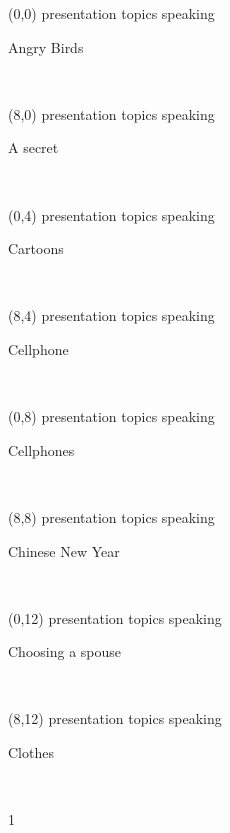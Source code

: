 \documentclass[a4paper]{article}
\newcommand{\mycard}[5]{%
	\small #1 #2
	\par
	\parbox[t][6.7cm][c]{9.5cm}{%
	\hspace{0.1cm} \Large#3\\
	\normalsize#4 #5
	}
}
\begin{document}
\selectfont

\begin{textblock}{8}(0,0)
\mycard{presentation topics}{speaking}{\parbox{9.0cm}{
\centering Angry Birds   
}}{}{} 
\end{textblock}

\begin{textblock}{8}(8,0)
\mycard{presentation topics}{speaking}{\parbox{9.0cm}{
\centering A secret    
}}{}{} 
\end{textblock}

\begin{textblock}{8}(0,4)
\mycard{presentation topics}{speaking}{\parbox{9.0cm}{
\centering Cartoons     
}}{}{} 
\end{textblock}

\begin{textblock}{8}(8,4)
\mycard{presentation topics}{speaking}{\parbox{9.0cm}{
\centering Cellphone  
}}{}{} 
\end{textblock}

\begin{textblock}{8}(0,8)
\mycard{presentation topics}{speaking}{\parbox{9.0cm}{
\centering Cellphones  
}}{}{} 
\end{textblock}

\begin{textblock}{8}(8,8)
\mycard{presentation topics}{speaking}{\parbox{9.0cm}{
\centering Chinese New Year 
}}{}{} 
\end{textblock}

\begin{textblock}{8}(0,12)
\mycard{presentation topics}{speaking}{\parbox{9.0cm}{
\centering Choosing a spouse     
}}{}{} 
\end{textblock}

\begin{textblock}{8}(8,12)
\mycard{presentation topics}{speaking}{\parbox{9.0cm}{
\centering Clothes    
}}{}{} 
\end{textblock}

\begin{tiny}1\end{tiny}\\
\newpage
\end{document}
